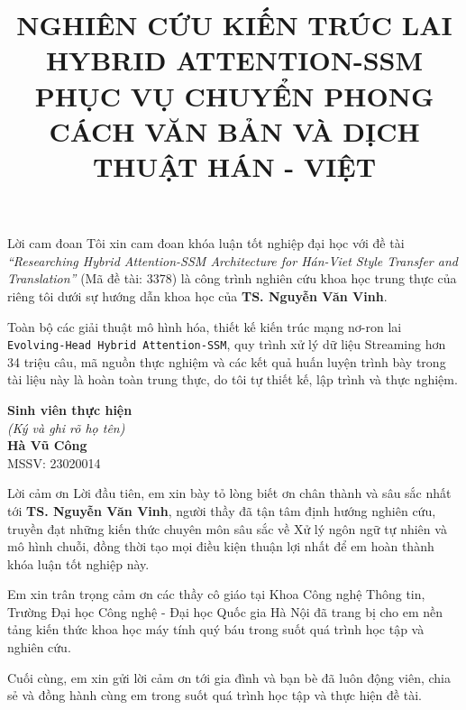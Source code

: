 \documentclass{uetgraduation}
\begin{document}
\title{NGHIÊN CỨU KIẾN TRÚC LAI HYBRID ATTENTION-SSM PHỤC VỤ CHUYỂN PHONG CÁCH VĂN BẢN VÀ DỊCH THUẬT HÁN - VIỆT}


\makecovers

\begin{preamble}{Lời cam đoan}
Tôi xin cam đoan khóa luận tốt nghiệp đại học với đề tài \textit{``Researching Hybrid Attention-SSM Architecture for Hán-Viet Style Transfer and Translation''} (Mã đề tài: 3378) là công trình nghiên cứu khoa học trung thực của riêng tôi dưới sự hướng dẫn khoa học của \textbf{TS. Nguyễn Văn Vinh}.

Toàn bộ các giải thuật mô hình hóa, thiết kế kiến trúc mạng nơ-ron lai \texttt{Evolving-Head Hybrid Attention-SSM}, quy trình xử lý dữ liệu Streaming hơn 34 triệu câu, mã nguồn thực nghiệm và các kết quả huấn luyện trình bày trong tài liệu này là hoàn toàn trung thực, do tôi tự thiết kế, lập trình và thực nghiệm.

\vspace{1.5cm}
\begin{flushright}
\textbf{Sinh viên thực hiện}\\
\textit{(Ký và ghi rõ họ tên)}\\
\vspace{1.5cm}
\textbf{Hà Vũ Công}\\
MSSV: 23020014
\end{flushright}
\end{preamble}

\begin{preamble}{Lời cảm ơn}
Lời đầu tiên, em xin bày tỏ lòng biết ơn chân thành và sâu sắc nhất tới \textbf{TS. Nguyễn Văn Vinh}, người thầy đã tận tâm định hướng nghiên cứu, truyền đạt những kiến thức chuyên môn sâu sắc về Xử lý ngôn ngữ tự nhiên và mô hình chuỗi, đồng thời tạo mọi điều kiện thuận lợi nhất để em hoàn thành khóa luận tốt nghiệp này.

Em xin trân trọng cảm ơn các thầy cô giáo tại Khoa Công nghệ Thông tin, Trường Đại học Công nghệ - Đại học Quốc gia Hà Nội đã trang bị cho em nền tảng kiến thức khoa học máy tính quý báu trong suốt quá trình học tập và nghiên cứu.

Cuối cùng, em xin gửi lời cảm ơn tới gia đình và bạn bè đã luôn động viên, chia sẻ và đồng hành cùng em trong suốt quá trình học tập và thực hiện đề tài.
\end{preamble}
\end{document}
